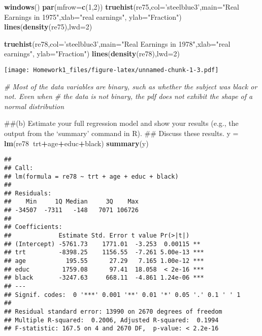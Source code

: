 \documentclass[]{article}
\newenvironment{Shaded}{\begin{snugshade}}{\end{snugshade}}
\newcommand{\KeywordTok}[1]{\textcolor[rgb]{0.13,0.29,0.53}{\textbf{#1}}}
\newcommand{\DataTypeTok}[1]{\textcolor[rgb]{0.13,0.29,0.53}{#1}}
\newcommand{\DecValTok}[1]{\textcolor[rgb]{0.00,0.00,0.81}{#1}}
\newcommand{\StringTok}[1]{\textcolor[rgb]{0.31,0.60,0.02}{#1}}
\newcommand{\CommentTok}[1]{\textcolor[rgb]{0.56,0.35,0.01}{\textit{#1}}}
\newcommand{\OperatorTok}[1]{\textcolor[rgb]{0.81,0.36,0.00}{\textbf{#1}}}
\newcommand{\NormalTok}[1]{#1}
\begin{document}
\begin{Shaded}
\begin{Highlighting}[]
\KeywordTok{windows}\NormalTok{()}
\KeywordTok{par}\NormalTok{(}\DataTypeTok{mfrow=}\KeywordTok{c}\NormalTok{(}\DecValTok{1}\NormalTok{,}\DecValTok{2}\NormalTok{))}
\KeywordTok{truehist}\NormalTok{(re75,}\DataTypeTok{col=}\StringTok{'steelblue3'}\NormalTok{,}\DataTypeTok{main=}\StringTok{"Real Earnings in 1975"}\NormalTok{,}\DataTypeTok{xlab=}\StringTok{"real earnings"}\NormalTok{, }\DataTypeTok{ylab=}\StringTok{"Fraction"}\NormalTok{)}
\KeywordTok{lines}\NormalTok{(}\KeywordTok{density}\NormalTok{(re75),}\DataTypeTok{lwd=}\DecValTok{2}\NormalTok{)}

\KeywordTok{truehist}\NormalTok{(re78,}\DataTypeTok{col=}\StringTok{'steelblue3'}\NormalTok{,}\DataTypeTok{main=}\StringTok{"Real Earnings in 1978"}\NormalTok{,}\DataTypeTok{xlab=}\StringTok{"real earnings"}\NormalTok{, }\DataTypeTok{ylab=}\StringTok{"Fraction"}\NormalTok{)}
\KeywordTok{lines}\NormalTok{(}\KeywordTok{density}\NormalTok{(re78),}\DataTypeTok{lwd=}\DecValTok{2}\NormalTok{)}
\end{Highlighting}
\end{Shaded}

\texttt{[image: Homework1\_files/figure-latex/unnamed-chunk-1-3.pdf]}

\begin{Shaded}
\begin{Highlighting}[]
\CommentTok{# Most of the data variables are binary, such as whether the subject was black or not. Even when }
\CommentTok{# the data is not binary, the pdf does not exhibit the shape of a normal distribution}

\NormalTok{##(b) Estimate your full regression model and show your results (e.g., the output from the `summary' command in R).}
\NormalTok{##    Discuss these results. }
\NormalTok{y =}\StringTok{ }\KeywordTok{lm}\NormalTok{(re78}\OperatorTok{~}\NormalTok{trt}\OperatorTok{+}\NormalTok{age}\OperatorTok{+}\NormalTok{educ}\OperatorTok{+}\NormalTok{black)}
\KeywordTok{summary}\NormalTok{(y)}
\end{Highlighting}
\end{Shaded}

\begin{verbatim}
## 
## Call:
## lm(formula = re78 ~ trt + age + educ + black)
## 
## Residuals:
##    Min     1Q Median     3Q    Max 
## -34507  -7311   -148   7071 106726 
## 
## Coefficients:
##             Estimate Std. Error t value Pr(>|t|)    
## (Intercept) -5761.73    1771.01  -3.253  0.00115 ** 
## trt         -8398.25    1156.55  -7.261 5.00e-13 ***
## age           195.55      27.29   7.165 1.00e-12 ***
## educ         1759.08      97.41  18.058  < 2e-16 ***
## black       -3247.63     668.11  -4.861 1.24e-06 ***
## ---
## Signif. codes:  0 '***' 0.001 '**' 0.01 '*' 0.05 '.' 0.1 ' ' 1
## 
## Residual standard error: 13990 on 2670 degrees of freedom
## Multiple R-squared:  0.2006, Adjusted R-squared:  0.1994 
## F-statistic: 167.5 on 4 and 2670 DF,  p-value: < 2.2e-16
\end{verbatim}
\end{document}
